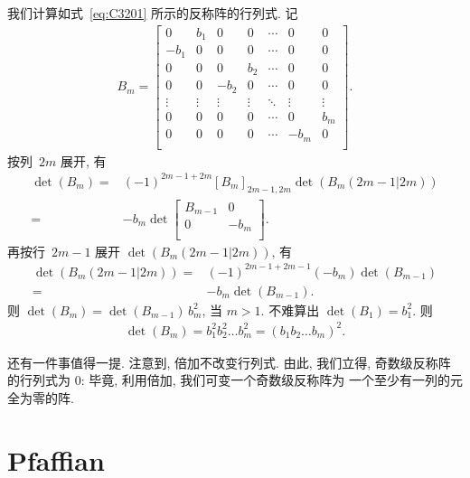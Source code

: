 我们计算如式~\eqref{eq:C3201} 所示的反称阵的行列式.
记
\begin{align*}
    B_m =
    \begin{bmatrix}
        0      & b_1    & 0      & 0      & \cdots & 0      & 0      \\
        -b_1   & 0      & 0      & 0      & \cdots & 0      & 0      \\
        0      & 0      & 0      & b_2    & \cdots & 0      & 0      \\
        0      & 0      & -b_2   & 0      & \cdots & 0      & 0      \\
        \vdots & \vdots & \vdots & \vdots & \ddots & \vdots & \vdots \\
        0      & 0      & 0      & 0      & \cdots & 0      & b_m    \\
        0      & 0      & 0      & 0      & \cdots & -b_m   & 0      \\
    \end{bmatrix}.
\end{align*}
按列~\(2m\) 展开, 有
\begin{align*}
    \det {(B_m)}
    = {} &
    (-1)^{2m-1+2m} [B_m]_{2m-1,2m} \det {(B_m ({2m-1}|{2m}))}
    \\
    = {} &
    {-b_m} \det {
        \begin{bmatrix}
            B_{m-1} & 0    \\
            0       & -b_m \\
        \end{bmatrix}
    }.
\end{align*}
再按行~\(2m-1\) 展开 \(\det {(B_m ({2m-1}|{2m}))}\), 有
\begin{align*}
    \det {(B_m ({2m-1}|{2m}))}
    = {} & (-1)^{2m-1+2m-1} (-b_m)
    \det {(B_{m-1})}                \\
    = {} & {-b_m} \det {(B_{m-1})}.
\end{align*}
则 \(\det {(B_m)} = \det {(B_{m-1})}\, b_m^2\),
当 \(m > 1\).
不难算出 \(\det {(B_1)} = b_1^2\).
则
\begin{align*}
    \det {(B_m)} = b_1^2 b_2^2 \dots b_m^2
    = (b_1 b_2 \dots b_m)^2.
\end{align*}

还有一件事值得一提.
注意到, 倍加不改变行列式.
由此, 我们立得, 奇数级反称阵的行列式为 \(0\):
毕竟, 利用倍加, 我们可变一个奇数级反称阵为%
一个至少有一列的元全为零的阵.

\section{Pfaffian}

